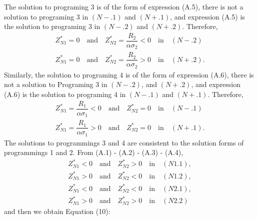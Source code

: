 \documentclass[10pt]{article}
\begin{document}
The solution to programing 3 is of the form of expression (A.5), there is not a solution to programing 3 in $ (N-.1) $ and $ (N+.1) $, and expression (A.5) is the solution to programing 3 in $ (N-.2) $ and $ (N+.2) $. Therefore,
\begin{eqnarray*}
& Z_{N1}^* = 0 \quad \text{and} \quad Z_{N2}^* = \dfrac{R_2}{\alpha \sigma_2} < 0 \quad \text{in} \quad (N-.2) & \\
& Z_{N1}^* = 0 \quad \text{and} \quad Z_{N2}^* = \dfrac{R_2}{\alpha \sigma_2} > 0 \quad \text{in} \quad (N+.2). &
\end{eqnarray*}
Similarly, the solution to programing 4 is of the form of expression (A.6), there is not a solution to Programing 3 in $ (N-.2) $, and $ (N+.2) $, and expression (A.6) is the solution to programing 4 in $ (N-.1) $ and $ (N+.1) $. Therefore,
\begin{eqnarray*}
& Z_{N1}^* = \dfrac{R_1}{\alpha \sigma_1} < 0 \quad \text{and} \quad Z_{N2}^* = 0 \quad \text{in} \quad (N-.1) & \\
& Z_{N1}^* = \dfrac{R_1}{\alpha \sigma_1} > 0 \quad \text{and} \quad Z_{N2}^* = 0 \quad \text{in} \quad (N+.1). &
\end{eqnarray*}
The solutions to programmings 3 and 4 are consistent to the solution forms of programmings 1 and 2. From (A.1) - (A.2) - (A.3) - (A.4), 
\begin{eqnarray*}
& Z_{N1}^* < 0 \quad \text{and} \quad Z_{N2}^* > 0 \quad \text{in} \quad (N1.1), & \\
& Z_{N1}^* > 0 \quad \text{and} \quad Z_{N2}^* < 0 \quad \text{in} \quad (N1.2), & \\
& Z_{N1}^* < 0 \quad \text{and} \quad Z_{N2}^* < 0 \quad \text{in} \quad (N2.1), & \\
& Z_{N1}^* > 0 \quad \text{and} \quad Z_{N2}^* > 0 \quad \text{in} \quad (N2.2) & 
\end{eqnarray*}
and then we obtain Equation (10):
\end{document}
